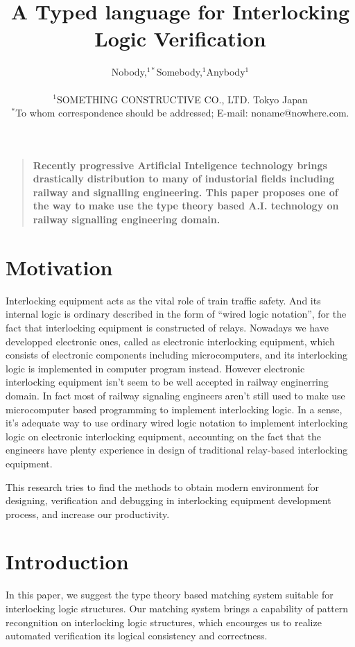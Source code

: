 \documentclass[12pt]{article}
\title{A Typed language for Interlocking Logic Verification}
\author
{Nobody,$^{1\ast}$Somebody,$^{1}$Anybody$^{1}$\\
\\
\normalsize{$^{1}$SOMETHING CONSTRUCTIVE  CO., LTD. Tokyo Japan}\\
\normalsize{$^\ast$To whom correspondence should be addressed;
  E-mail: noname@nowhere.com.}
}
\date{}
\newenvironment{sciabstract}{%
\begin{quote} \bf}
{\end{quote}}
\begin{document}
 


\baselineskip24pt


\maketitle 




\begin{sciabstract}
  Recently progressive Artificial Inteligence technology brings drastically
  distribution to many of industorial fields including railway and
  signalling engineering. This paper proposes one of the way to
  make use the type theory based A.I. technology on railway signalling
  engineering domain.
\end{sciabstract}


\section{Motivation}
Interlocking equipment acts as the vital role of train traffic safety. And
its internal logic is ordinary described in the form of ``wired logic
notation'', for the fact that interlocking equipment is constructed of
relays.
Nowadays we have developped electronic ones, called as electronic
interlocking equipment, which consists of electronic components including
microcomputers, and its interlocking logic is implemented in computer
program instead.
However electronic interlocking equipment isn't seem to be well accepted in
railway enginerring domain. In fact most of railway signaling engineers
aren't still used to make use microcomputer based programming to implement
interlocking logic.
In a sense, it's adequate way to use ordinary wired logic notation to
implement interlocking logic on electronic interlocking equipment,
accounting on the fact that the engineers have plenty experience in design
of traditional relay-based interlocking equipment.

This research tries to find the methods to obtain modern environment
for designing, verification and debugging in interlocking
equipment development process, and increase our productivity.


\section{Introduction}
In this paper, we suggest the type theory based matching system suitable
for interlocking logic structures. Our matching system brings a capability
of pattern recongnition on interlocking logic structures, which encourges us
to realize automated verification its logical consistency and correctness.
\end{document}
